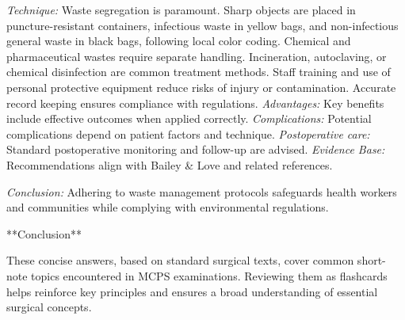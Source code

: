 \documentclass{article}
\begin{document}
\emph{Technique:} Waste segregation is paramount. Sharp objects are placed in puncture-resistant containers, infectious waste in yellow bags, and non-infectious general waste in black bags, following local color coding. Chemical and pharmaceutical wastes require separate handling. Incineration, autoclaving, or chemical disinfection are common treatment methods. Staff training and use of personal protective equipment reduce risks of injury or contamination. Accurate record keeping ensures compliance with regulations.
\emph{Advantages:} Key benefits include effective outcomes when applied correctly.
\emph{Complications:} Potential complications depend on patient factors and technique.
\emph{Postoperative care:} Standard postoperative monitoring and follow-up are advised.
\emph{Evidence Base:} Recommendations align with Bailey \& Love and related references.

\emph{Conclusion:} Adhering to waste management protocols safeguards health workers and communities while complying with environmental regulations.


**Conclusion**

These concise answers, based on standard surgical texts, cover common short-note topics encountered in MCPS examinations. Reviewing them as flashcards helps reinforce key principles and ensures a broad understanding of essential surgical concepts.
\end{document}
